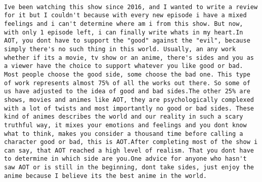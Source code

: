 \documentclass[
]{article}
\begin{document}
\begin{verbatim}
                                                                                                                                                                                                                                                                                                                                                                                                                                                                                                                                                                                                                                                                                                                                                                                                                                                                                                                                                                                                                                                                                                                                                                                                                                                                                                                                                                                                                                                                                                                                                                                                                                                                                                                                                                           Ive been watching this show since 2016, and I wanted to write a review for it but I couldn't because with every new episode i have a mixed feelings and i can't determine where am i from this show. But now, with only 1 episode left, i can finally write whats in my heart.In AOT, you dont have to support the "good" against the "evil", because simply there's no such thing in this world. Usually, an any work whether if its a movie, tv show or an anime, there's sides and you as a viewer have the choice to support whatever you like good or bad. Most people choose the good side, some choose the bad one. This type of work represents almost 75% of all the works out there. So some of us have adjusted to the idea of good and bad sides.The other 25% are shows, movies and animes like AOT, they are psychologically complexed with a lot of twists and most importantly no good or bad sides. These kind of animes describes the world and our reality in such a scary truthful way, it mixes your emotions and feelings and you dont know what to think, makes you consider a thousand time before calling a character good or bad, this is AOT.After completing most of the show i can say, that AOT reached a high level of realism. That you dont have to determine in which side are you.One advice for anyone who hasn't saw AOT or is still in the beginning, dont take sides, just enjoy the anime because I believe its the best anime in the world.

\end{verbatim}
\end{document}
